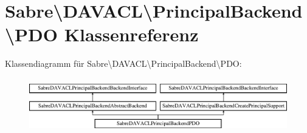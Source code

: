 \hypertarget{class_sabre_1_1_d_a_v_a_c_l_1_1_principal_backend_1_1_p_d_o}{}\section{Sabre\textbackslash{}D\+A\+V\+A\+CL\textbackslash{}Principal\+Backend\textbackslash{}P\+DO Klassenreferenz}
\label{class_sabre_1_1_d_a_v_a_c_l_1_1_principal_backend_1_1_p_d_o}
Klassendiagramm für Sabre\textbackslash{}D\+A\+V\+A\+CL\textbackslash{}Principal\+Backend\textbackslash{}P\+DO\+:\begin{figure}[H]
\begin{center}
\leavevmode
\includegraphics[height=2.406877cm]{class_sabre_1_1_d_a_v_a_c_l_1_1_principal_backend_1_1_p_d_o}
\end{center}
\end{figure}

